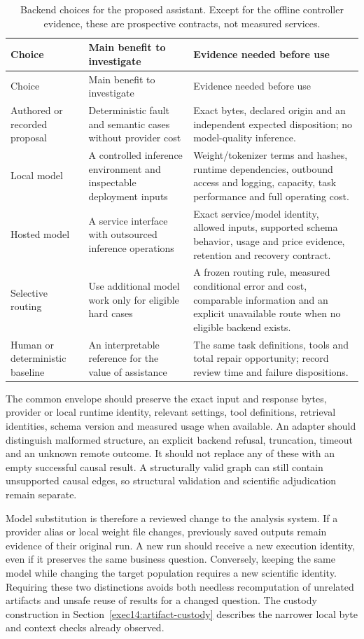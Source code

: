 \begin{longtable}{@{}p{}p{}p{}@{}}
\caption{Backend choices for the proposed assistant. Except for the offline
controller evidence, these are prospective contracts, not measured services.}
\label{exec14:l6-backends}\\
\toprule Choice & Main benefit to investigate & Evidence needed before use\\\midrule
\endfirsthead
\toprule Choice & Main benefit to investigate & Evidence needed before use\\\midrule
\endhead
Authored or recorded proposal & Deterministic fault and semantic cases without
provider cost & Exact bytes, declared origin and an independent expected
disposition; no model-quality inference.\\
Local model & A controlled inference environment and inspectable deployment
inputs & Weight/tokenizer terms and hashes, runtime dependencies, outbound
access and logging, capacity, task performance and full operating cost.\\
Hosted model & A service interface with outsourced inference operations &
Exact service/model identity, allowed inputs, supported schema behavior,
usage and price evidence, retention and recovery contract.\\
Selective routing & Use additional model work only for eligible hard cases &
A frozen routing rule, measured conditional error and cost, comparable
information and an explicit unavailable route when no eligible backend exists.\\
Human or deterministic baseline & An interpretable reference for the value
of assistance & The same task definitions, tools and total repair opportunity;
record review time and failure dispositions.\\
\bottomrule
\end{longtable}

The common envelope should preserve the exact input and response bytes,
provider or local runtime identity, relevant settings, tool definitions,
retrieval identities, schema version and measured usage when available.
An adapter should distinguish malformed structure, an explicit backend
refusal, truncation, timeout and an unknown remote outcome. It should not
replace any of these with an empty successful causal result. A structurally
valid graph can still contain unsupported causal edges, so structural
validation and scientific adjudication remain separate.

Model substitution is therefore a reviewed change to the analysis system.
If a provider alias or local weight file changes, previously saved outputs
remain evidence of their original run. A new run should receive a new
execution identity, even if it preserves the same business question.
Conversely, keeping the same model while changing the target population
requires a new scientific identity. Requiring these two distinctions avoids
both needless recomputation of unrelated artifacts and unsafe reuse of
results for a changed question. The custody construction in
Section~\ref{exec14:artifact-custody} describes the narrower local byte and
context checks already observed.

